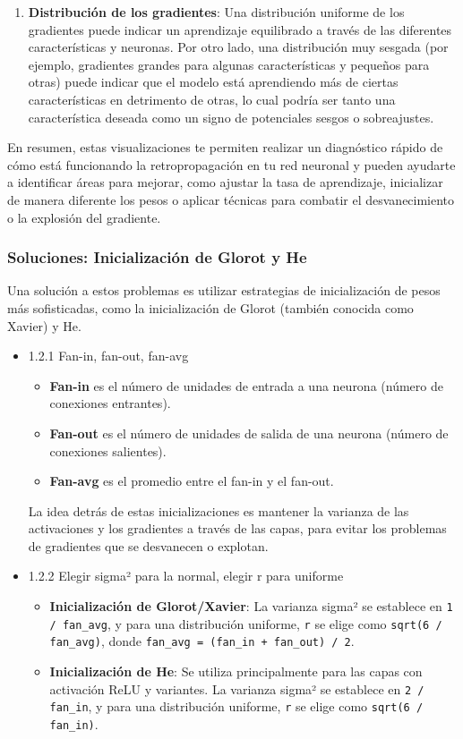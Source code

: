 \documentclass[11pt]{article}
\begin{document}
\begin{enumerate}
\item \textbf{Distribución de los gradientes}: Una distribución uniforme de los
gradientes puede indicar un aprendizaje equilibrado a través de las
diferentes características y neuronas. Por otro lado, una
distribución muy sesgada (por ejemplo, gradientes grandes para
algunas características y pequeños para otras) puede indicar que el
modelo está aprendiendo más de ciertas características en detrimento
de otras, lo cual podría ser tanto una característica deseada como un
signo de potenciales sesgos o sobreajustes.
\end{enumerate}

En resumen, estas visualizaciones te permiten realizar un diagnóstico
rápido de cómo está funcionando la retropropagación en tu red neuronal y
pueden ayudarte a identificar áreas para mejorar, como ajustar la tasa
de aprendizaje, inicializar de manera diferente los pesos o aplicar
técnicas para combatir el desvanecimiento o la explosión del gradiente.

\subsubsection{Soluciones: Inicialización de Glorot y He}
\label{sec:org47fb5c9}
Una solución a estos problemas es utilizar estrategias de inicialización
de pesos más sofisticadas, como la inicialización de Glorot (también
conocida como Xavier) y He.

\begin{itemize}
\item 1.2.1 Fan-in, fan-out, fan-avg
\label{sec:org88a7772}
\begin{itemize}
\item \textbf{Fan-in} es el número de unidades de entrada a una neurona (número de
conexiones entrantes).
\item \textbf{Fan-out} es el número de unidades de salida de una neurona (número de
conexiones salientes).
\item \textbf{Fan-avg} es el promedio entre el fan-in y el fan-out.
\end{itemize}

La idea detrás de estas inicializaciones es mantener la varianza de las
activaciones y los gradientes a través de las capas, para evitar los
problemas de gradientes que se desvanecen o explotan.

\item 1.2.2 Elegir sigma² para la normal, elegir r para uniforme
\label{sec:orge37d054}
\begin{itemize}
\item \textbf{Inicialización de Glorot/Xavier}: La varianza sigma² se establece en
\texttt{1 / fan\_avg}, y para una distribución uniforme, \texttt{r} se elige como
\texttt{sqrt(6 / fan\_avg)}, donde \texttt{fan\_avg = (fan\_in + fan\_out) / 2}.
\item \textbf{Inicialización de He}: Se utiliza principalmente para las capas con
activación ReLU y variantes. La varianza sigma² se establece en
\texttt{2 / fan\_in}, y para una distribución uniforme, \texttt{r} se elige como
\texttt{sqrt(6 / fan\_in)}.
\end{itemize}
\end{itemize}
\end{document}
